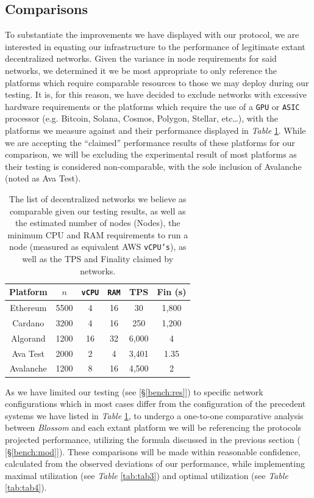 \subsection{Comparisons}\label{bench:comp}
To substantiate the improvements we have displayed with our protocol, we are interested in equating our infrastructure to the performance of legitimate extant decentralized networks. Given the variance in node requirements for said networks, we determined it we be most appropriate to only reference the platforms which require comparable resources to those we may deploy during our testing. It is, for this reason, we have decided to exclude networks with excessive hardware requirements or the platforms which require the use of a \texttt{GPU} or \texttt{ASIC} processor (e.g. Bitcoin, Solana, Cosmos, Polygon, Stellar, etc…), with the platforms we measure against and their performance displayed in \textit{Table} \ref{tab:tab2}. While we are accepting the “claimed” performance results of these platforms for our comparison, we will be excluding the experimental result of most platforms as their testing is considered non-comparable, with the sole inclusion of Avalanche (noted as Ava Test).

\begin{table}[!h]
\centering
    \begin{tabular}{cccccc}
     \hline
     \textbf{Platform}& $n$ & \texttt{vCPU} &\texttt{RAM} &TPS&Fin (s)\\
     \hline
     Ethereum &5500 &4 &16 &30 &1,800\\
     Cardano &3200 &4 &16 &250 &1,200\\
     Algorand &1200 &16 &32 &6,000 &4\\
     Ava Test &2000 &2 &4 &3,401 &1.35\\
     Avalanche &1200 &8 &16 &4,500 &2\\
     \hline

    \end{tabular}
    \caption{The list of decentralized networks we believe as comparable given our testing results, as well as the estimated number of nodes (Nodes), the minimum CPU and RAM requirements to run a node (measured as equivalent AWS \texttt{vCPU’s}), as well as the TPS and Finality claimed by networks.}
    \label{tab:tab2}
\end{table}

As we have limited our testing (see \textit{} [\S\ref{bench:res}]) to specific network configurations which in most cases differ from the configuration of the precedent systems we have listed in \textit{Table} \ref{tab:tab2}, to undergo a one-to-one comparative analysis between \textit{Blossom} and each extant platform we will be referencing the protocols projected performance, utilizing the formula discussed in the previous section (\textit{} [\S\ref{bench:mod}]). These comparisons will be made within reasonable confidence, calculated from the observed deviations of our performance, while implementing maximal utilization (see \textit{Table} \ref{tab:tab3}) and optimal utilization (see \textit{Table} \ref{tab:tab4}).

